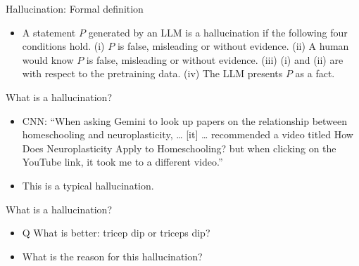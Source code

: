                     

\begin{vbframe}{Hallucination: Formal definition}

\vfill


	\begin{itemize}
		\item
A statement $P$ generated by an LLM is a hallucination if
the following four conditions hold.
    (i) $P$ is false, misleading or without evidence.
        (ii) A human would know $P$ is false, misleading or
            without evidence.
                (iii) (i) and (ii) are with respect to the
                pretraining data.
                    (iv) The LLM presents $P$ as a fact.
	\end{itemize}

\vfill

\end{vbframe}


\begin{vbframe}{What is a hallucination?}

\vfill


	\begin{itemize}

\item
CNN: ``When asking Gemini to look up papers on the relationship
between homeschooling and neuroplasticity, \ldots
[it] \ldots
recommended a video titled How Does
Neuroplasticity Apply to Homeschooling? but when clicking on
the YouTube link, it took me to a different video.''

\item This is a typical hallucination.
\end{itemize}

\vfill

\end{vbframe}

\begin{vbframe}{What is a hallucination?}

\vfill


	\begin{itemize}


\item
 Q What is better: tricep dip or
 triceps dip?

\item \ques What is the reason for this hallucination?

\end{itemize}



\vfill


\end{vbframe}


